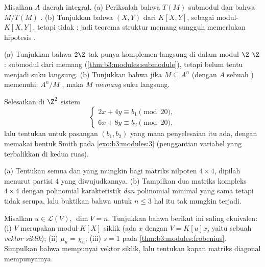 \begin{exercise}[$\star\star$]\label{exo:b3:modules:5}
Misalkan $A$ daerah integral. (a) Periksalah bahwa $T(M)$ submodul dan
bahwa $M/T(M)$  . (b) Tunjukkan bahwa  $(X, Y)$
dari $K[X,Y]$, sebagai modul-$K[X,Y]$,   tetapi tidak :
jadi teorema struktur memang sungguh memerlukan hipotesis .
\end{exercise}

\begin{exercise}[$\star\star$]\label{exo:b3:modules:6}
(a) Tunjukkan bahwa $2\Z$ tak punya komplemen langsung di dalam modul-$\Z$
$\Z$: submodul dari  memang 
(\cref{thm:b3:modules:submodule}), tetapi belum tentu menjadi suku
langsung. (b) Tunjukkan bahwa jika $M \subseteq A^n$ (dengan $A$ sebuah ) memenuhi:
$A^n/M$  , maka $M$ \emph{memang} suku langsung.
\end{exercise}

\begin{exercise}[$\star\star$]\label{exo:b3:modules:7}
Selesaikan di $\Z^2$ sistem
\[
\begin{cases}
2x + 4y \equiv b_1 \pmod{20},\\
6x + 8y \equiv b_2 \pmod{20},
\end{cases}
\]
lalu tentukan untuk pasangan $(b_1, b_2)$ yang mana penyelesaian itu ada, dengan memakai bentuk
Smith pada \cref{exo:b3:modules:3} (penggantian variabel yang terbalikkan
di kedua ruas).
\end{exercise}

\begin{exercise}[$\star\star$]\label{exo:b3:modules:8}
(a) Tentukan semua  dan  yang mungkin
bagi matriks nilpoten $4 \times 4$, dipilah menurut partisi
$4$ yang diwujudkannya.
(b) Tampilkan dua matriks kompleks $4\times4$ dengan polinomial
karakteristik \emph{dan} polinomial minimal yang sama tetapi tidak
serupa, lalu buktikan bahwa untuk $n \leq 3$ hal itu tak mungkin terjadi.
\end{exercise}

\begin{exercise}[$\star\star\star$]\label{exo:b3:modules:9}
Misalkan $u \in \mathcal L(V)$, $\dim V = n$. Tunjukkan bahwa berikut ini
saling ekuivalen: (i) $V$ merupakan modul-$K[X]$ siklik (ada $x$
dengan $V = K[u]x$, yaitu sebuah \emph{vektor siklik}); (ii) $\mu_u = \chi_u$;
(iii) $s = 1$ pada \cref{thm:b3:modules:frobenius}. Simpulkan bahwa
 mempunyai vektor siklik, lalu tentukan kapan
matriks diagonal mempunyainya.
\end{exercise}

